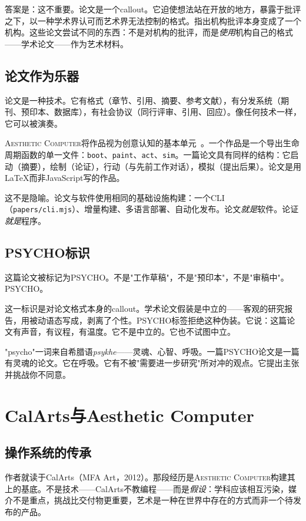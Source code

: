 \documentclass[10pt,letterpaper,twocolumn]{article}
\newcommand{\ac}{\textsc{Aesthetic Computer}}
\begin{document}
答案是：这不重要。论文是一个callout。它迫使想法站在开放的地方，暴露于批评之下，以一种学术界认可而艺术界无法控制的格式。\citet{fraser2005critique}指出机构批评本身变成了一个机构。这些论文尝试不同的东西：不是对机构的批评，而是\emph{使用}机构自己的格式——学术论文——作为艺术材料。

\subsection{论文作为乐器}

论文是一种技术。它有格式（章节、引用、摘要、参考文献），有分发系统（期刊、预印本、数据库），有社会协议（同行评审、引用、回应）。像任何技术一样，它可以被演奏。

\ac{}将作品视为创意认知的基本单元~\citep{scudder2026pieces}。一个作品是一个导出生命周期函数的单一文件：\texttt{boot}、\texttt{paint}、\texttt{act}、\texttt{sim}。一篇论文具有同样的结构：它启动（摘要），绘制（论证），行动（与先前工作对话），模拟（提出后果）。论文是用\LaTeX{}而非JavaScript写的作品。

这不是隐喻。论文与软件使用相同的基础设施构建：一个CLI（\texttt{papers/cli.mjs}）、增量构建、多语言部署、自动化发布。论文\emph{就是}软件。论证\emph{就是}程序。

\subsection{PSYCHO标识}

这篇论文被标记为PSYCHO。不是"工作草稿"，不是"预印本"，不是"审稿中"。PSYCHO。

这一标识是对论文格式本身的callout。学术论文假装是中立的——客观的研究报告，用被动语态写成，剥离了个性。PSYCHO标签拒绝这种伪装。它说：这篇论文有声音，有议程，有温度。它不是中立的。它也不试图中立。

"psycho"一词来自希腊语\textit{psykhe}——灵魂、心智、呼吸。一篇PSYCHO论文是一篇有灵魂的论文。它在呼吸。它有不被"需要进一步研究"所对冲的观点。它提出主张并挑战你不同意。

\section{CalArts与Aesthetic Computer}

\subsection{操作系统的传承}

作者就读于CalArts（MFA Art，2012）。那段经历是\ac{}构建其上的基底。不是技术——CalArts不教编程——而是\emph{假设}：学科应该相互污染，媒介不是重点，挑战比交付物更重要，艺术是一种在世界中存在的方式而非一个待发布的产品。
\end{document}
